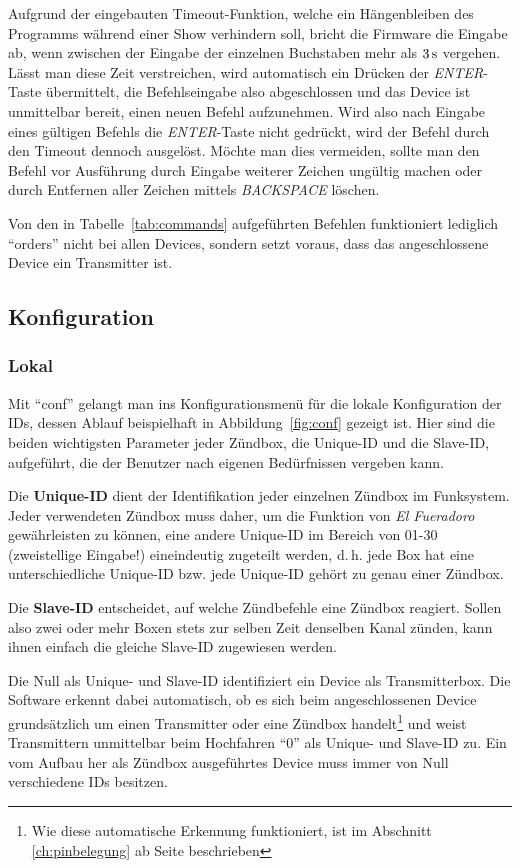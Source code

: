 \documentclass[pdftex, parskip, numbers=noenddot, toc=listof]{scrbook}
\newcommand{\anlage}{\emph{El Fueradoro}}
\begin{document}
	Aufgrund der eingebauten Timeout-Funktion, welche ein Hängenbleiben des Programms während einer Show verhindern soll, bricht die Firmware die Eingabe ab, wenn zwischen der Eingabe der einzelnen Buchstaben mehr als $\unit[3]{s}$ vergehen. Lässt man diese Zeit verstreichen, wird automatisch ein Drücken der \emph{ENTER}-Taste übermittelt, die Befehlseingabe also abgeschlossen und das Device ist unmittelbar bereit, einen neuen Befehl aufzunehmen. Wird also nach Eingabe eines gültigen Befehls die \emph{ENTER}-Taste nicht gedrückt, wird der Befehl durch den Timeout dennoch ausgelöst. Möchte man dies vermeiden, sollte man den Befehl vor Ausführung durch Eingabe weiterer Zeichen ungültig machen oder durch Entfernen aller Zeichen mittels \emph{BACKSPACE} löschen.

	Von den in Tabelle~\ref{tab:commands} aufgeführten Befehlen funktioniert lediglich \enquote{orders} nicht bei allen Devices, sondern setzt voraus, dass das angeschlossene Device ein Transmitter ist.


	\subsection{Konfiguration}
	\label{sec:config}

	\subsubsection{Lokal}
	\label{subsec:localconf}

	Mit \enquote{conf} gelangt man ins Konfigurationsmenü für die lokale Konfiguration der IDs, dessen Ablauf beispielhaft in Abbildung~\ref{fig:conf} gezeigt ist. Hier sind die beiden wichtigsten Parameter jeder Zündbox, die Unique-ID und die Slave-ID, aufgeführt, die der Benutzer nach eigenen Bedürfnissen vergeben kann.

	Die \textbf{Unique-ID} dient der Identifikation jeder einzelnen Zündbox im Funksystem. Jeder verwendeten Zündbox muss daher, um die Funktion von {\anlage} gewährleisten zu können, eine andere Unique-ID im Bereich von 01-30 (zweistellige Eingabe!) eineindeutig zugeteilt werden, d.\,h. jede Box hat eine unterschiedliche Unique-ID bzw. jede Unique-ID gehört zu genau einer Zündbox.

	Die \textbf{Slave-ID} entscheidet, auf welche Zündbefehle eine Zündbox reagiert. Sollen also zwei oder mehr Boxen stets zur selben Zeit denselben Kanal zünden, kann ihnen einfach die gleiche Slave-ID zugewiesen werden.

	Die Null als Unique- und Slave-ID identifiziert ein Device als Transmitterbox. Die Software erkennt dabei automatisch, ob es sich beim angeschlossenen Device grundsätzlich um einen Transmitter oder eine Zündbox handelt\footnote{Wie diese automatische Erkennung funktioniert, ist im Abschnitt \ref{ch:pinbelegung} ab Seite \pageref{ch:pinbelegung} beschrieben} und weist Transmittern unmittelbar beim Hochfahren \enquote{0} als Unique- und Slave-ID zu. Ein vom Aufbau her als Zündbox ausgeführtes Device muss immer von Null verschiedene IDs besitzen.
\end{document}

